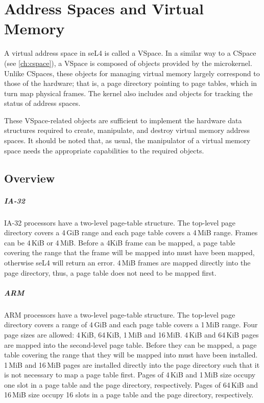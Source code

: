 %
%
%
%

\chapter{\label{ch:vspace}Address Spaces and Virtual Memory}

A virtual address space in seL4 is called a VSpace. In a similar
way to a CSpace (see \autoref{ch:cspace}), a VSpace is composed of objects 
provided by the microkernel. Unlike CSpaces, these objects for managing
virtual memory largely correspond to those of the hardware;
that is, a page directory pointing to page tables, which in turn map
physical frames.  The kernel also includes  and
 objects for tracking the status of address spaces.

These VSpace-related objects are sufficient to implement the
hardware data structures required to create, manipulate, and destroy
virtual memory address spaces. It should be noted that, as usual, the
manipulator of a virtual memory space needs the appropriate
capabilities to the required objects.

\section{Overview}
\ifxeightsix
\paragraph{IA-32}

IA-32 processors have a two-level page-table structure.
The top-level page directory covers a 4\,GiB range and each page table covers a 4\,MiB range.
Frames can be 4\,KiB or 4\,MiB.
Before a 4KiB
frame can be mapped, a page table covering the range that the frame will
be mapped into must have been mapped, otherwise seL4 will return an
error.
4\,MiB frames are mapped directly into the page directory, thus,
a page table does not need to be mapped first.
\fi

\paragraph{ARM}

ARM processors \fi have a two-level page-table structure.
The top-level page directory covers a range of 4\,GiB and each page table covers a 1\,MiB range.
Four page sizes are allowed: 4\,KiB, 64\,KiB, 1\,MiB and 16\,MiB.
4\,KiB and 64\,KiB pages are mapped into the second-level page table.
Before
they can be mapped, a page table covering the range that they will be
mapped into must have been installed.
1\,MiB and 16\,MiB pages are installed directly into the page directory such that it is not necessary to map a page table first.
Pages of 4\,KiB and 1\,MiB size occupy one slot in a page table and the page directory, respectively.
Pages of 64\,KiB and 16\,MiB size occupy 16 slots in a page table and the page directory, respectively.



